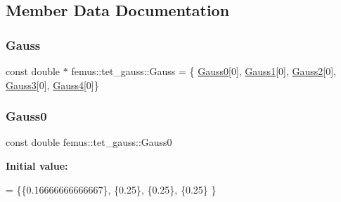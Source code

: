 \subsection{Member Data Documentation}
\mbox{\label{classfemus_1_1tet__gauss_a21f2069812fd38525937f4154103607e}} 
\subsubsection{\texorpdfstring{Gauss}{Gauss}}
{\footnotesize\ttfamily const double $\ast$ femus\+::tet\+\_\+gauss\+::\+Gauss = \{ \mbox{\hyperlink{classfemus_1_1tet__gauss_aa9f4d28a7fca924766bb8cdb19538e44}{Gauss0}}\mbox{[}0\mbox{]}, \mbox{\hyperlink{classfemus_1_1tet__gauss_acdd723265509236ea315d135a54bb59f}{Gauss1}}\mbox{[}0\mbox{]}, \mbox{\hyperlink{classfemus_1_1tet__gauss_a8362fd14ea7673223137a1a979449a9e}{Gauss2}}\mbox{[}0\mbox{]}, \mbox{\hyperlink{classfemus_1_1tet__gauss_a808c1acbb90665d6f95118cd67bdc447}{Gauss3}}\mbox{[}0\mbox{]}, \mbox{\hyperlink{classfemus_1_1tet__gauss_a96a28c287f5d6e91e3df80a4575178ab}{Gauss4}}\mbox{[}0\mbox{]}\}\hspace{0.3cm}{\ttfamily [static]}}

\mbox{\label{classfemus_1_1tet__gauss_aa9f4d28a7fca924766bb8cdb19538e44}} 
\subsubsection{\texorpdfstring{Gauss0}{Gauss0}}
{\footnotesize\ttfamily const double femus\+::tet\+\_\+gauss\+::\+Gauss0\hspace{0.3cm}{\ttfamily [static]}}

{\bfseries Initial value\+:}
\begin{DoxyCode}
= \{\{0.16666666666667\},
    \{0.25\},
    \{0.25\},
    \{0.25\}
  \}
\end{DoxyCode}
\mbox{\label{classfemus_1_1tet__gauss_acdd723265509236ea315d135a54bb59f}} 
